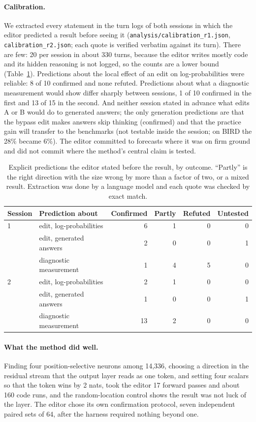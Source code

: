 \documentclass[11pt]{article}
\begin{document}
\paragraph{Calibration.} We extracted every statement in the turn logs of both sessions in which the editor predicted a result before seeing it (\texttt{analysis/calibration\_r1.json}, \texttt{calibration\_r2.json}; each quote is verified verbatim against its turn). There are few: 20 per session in about 330 turns, because the editor writes mostly code and its hidden reasoning is not logged, so the counts are a lower bound (Table~\ref{tab:calib}). Predictions about the local effect of an edit on log-probabilities were reliable: 8 of 10 confirmed and none refuted. Predictions about what a diagnostic measurement would show differ sharply between sessions, 1 of 10 confirmed in the first and 13 of 15 in the second. And neither session stated in advance what edits A or B would do to generated answers; the only generation predictions are that the bypass edit makes answers skip thinking (confirmed) and that the practice gain will transfer to the benchmarks (not testable inside the session; on BIRD the 28\% became 6\%). The editor committed to forecasts where it was on firm ground and did not commit where the method's central claim is tested.

\begin{table}[h]\centering\small
\begin{tabular}{llrrrr}
\toprule
Session & Prediction about & Confirmed & Partly & Refuted & Untested \\
\midrule
1 & edit, log-probabilities & 6 & 1 & 0 & 0 \\
 & edit, generated answers & 2 & 0 & 0 & 1 \\
 & diagnostic measurement & 1 & 4 & 5 & 0 \\
\midrule
2 & edit, log-probabilities & 2 & 1 & 0 & 0 \\
 & edit, generated answers & 1 & 0 & 0 & 1 \\
 & diagnostic measurement & 13 & 2 & 0 & 0 \\
\bottomrule
\end{tabular}
\caption{Explicit predictions the editor stated before the result, by outcome. ``Partly'' is the right direction with the size wrong by more than a factor of two, or a mixed result. Extraction was done by a language model and each quote was checked by exact match.}
\label{tab:calib}
\end{table}

\paragraph{What the method did well.} Finding four position-selective neurons among 14,336, choosing a direction in the residual stream that the output layer reads as one token, and setting four scalars so that the token wins by 2 nats, took the editor 17 forward passes and about 160 code runs, and the random-location control shows the result was not luck of the layer. The editor chose its own confirmation protocol, seven independent paired sets of 64, after the harness required nothing beyond one.
\end{document}
